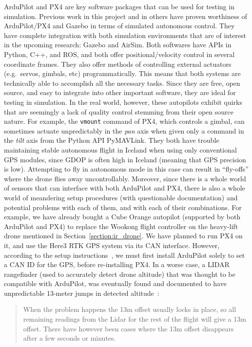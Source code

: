 ArduPilot and PX4 are key software packages that can be used for testing in simulation.
Previous work in this project and in others have proven worthiness of ArduPilot/PX4 and Gazebo in terms of simulated autonomous control.
They have complete integration with both simulation environments that are of interest in the upcoming research:
Gazebo and AirSim.
Both softwares have APIs in Python, C++, and ROS,
and both offer positional/velocity control in several coordinate frames.
They also offer methods of controlling external actuators (e.g.~servos, gimbals, etc) programmatically.
This means that both systems are technically able to accomplish all the necessary tasks.
Since they are free, open source, and easy to integrate into other important software, they are ideal for testing in simulation.
In the real world, however, these autopilots exhibit quirks that are seemingly a lack of quality control
stemming from their open source nature.
For example, the \texttt{vmount} command of PX4, which controls a gimbal, can sometimes actuate unpredictably
in the \textit{pan} axis when given only a command in the \textit{tilt} axis from the Python API PyMAVLink.
They both have trouble maintaining stable autonomous flight in Iceland when using only conventional GPS modules,
since GDOP is often high in Iceland (meaning that GPS precision is low).
Attempting to fly in autonomous mode in this case can result in ``fly-offs'' where the drone flies away uncontrollably.
Moreover, since there is a whole world of sensors that can interface with both ArduPilot and PX4,
there is also a whole world of meandering setup procedures (with questionable documentation) and potential problems with each of them,
and with each of their combinations.
For example, we have already bought a Cube Orange autopilot (supported by both ArduPilot and PX4) to replace the
Wookong flight controller on the heavy-lift drone mentioned in Section~\ref{section:ir_drone}.
We have planned to run PX4 on it, and use the Here3 RTK GPS system via its CAN interface.
However, according to the setup instructions~\cite{here3_manual},
we must first install ArduPilot solely to set a CAN ID for the GPS, before re-installing PX4.
In a worse case, a LIDAR rangefinder (used to accurately detect drone altitude) that was thought to be compatible with
ArduPilot, was eventually found and documented to have unpredictable 13-meter jumps in detected altitude~\cite{lidar_lite_rangefinder}:
\begin{quote}
    When the problem happens the 13m offset usually locks in place,
    so all remaining readings from the Lidar for the rest of the flight will give a 13m offset.
    There have however been cases where the 13m offset disappears after a few seconds or minutes.
\end{quote}
